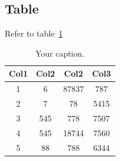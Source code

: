 \subsection{Table}

Refer to table~\ref{tab:demo-table}

\begin{table}[ht!]
    \begin{center}
        \begin{tabular}{||c c c c||} 
        \hline
        Col1 & Col2 & Col2 & Col3 \\ [0.5ex] 
        \hline\hline
        1 & 6 & 87837 & 787 \\ 
        \hline
        2 & 7 & 78 & 5415 \\
        \hline
        3 & 545 & 778 & 7507 \\
        \hline
        4 & 545 & 18744 & 7560 \\
        \hline
        5 & 88 & 788 & 6344 \\ [1ex] 
        \hline
        \end{tabular}
    \caption{\label{tab:demo-table}Your caption.}
    \end{center}
\end{table}
